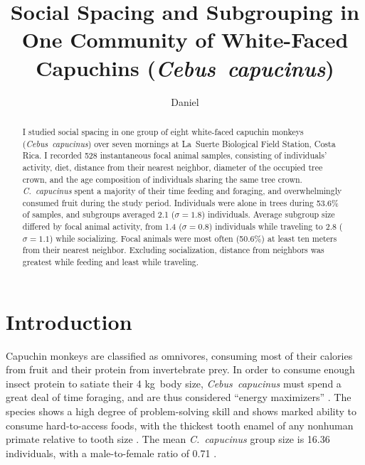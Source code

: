 \documentclass{../../../coursework}
\title{Social Spacing and Subgrouping in One Community of White-Faced Capuchins (\emph{Cebus~capucinus})}
\subtitle{}
\author{Daniel}{Glenn}{Leonard}
\date{\displaydate{date}}
\begin{document}
\maketitle

\begin{abstract}
    I studied social spacing in one group of eight white-faced capuchin
    monkeys (\emph{Cebus~capucinus}) over seven mornings at La~Suerte
    Biological Field Station, Costa Rica. I recorded 528 instantaneous focal
    animal samples, consisting of individuals' activity, diet, distance from
    their nearest neighbor, diameter of the occupied tree crown, and the age
    composition of individuals sharing the same tree crown.
    \emph{C.~capucinus} spent a majority of their time feeding and foraging,
    and overwhelmingly consumed fruit during the study period. Individuals
    were alone in trees during 53.6\% of samples, and subgroups averaged 2.1
    (\(\sigma = 1.8\)) individuals. Average subgroup size differed by focal
    animal activity, from 1.4 (\(\sigma = 0.8\)) individuals while traveling
    to 2.8 (\(\sigma = 1.1\)) while socializing. Focal animals were most often
    (50.6\%) at least ten meters from their nearest neighbor. Excluding
    socialization, distance from neighbors was greatest while feeding and
    least while traveling.
\end{abstract}

\printkeywords

\section{Introduction}

Capuchin monkeys are classified as omnivores, consuming most of their calories
from fruit and their protein from invertebrate prey. In order to consume
enough insect protein to satiate their 4 kg~body size, \emph{Cebus~capucinus}
must spend a great deal of time foraging, and are thus considered ``energy
maximizers'' \parencite{Fragaszy2004}. The species shows a high degree of
problem-solving skill and shows marked ability to consume hard-to-access
foods, with the thickest tooth enamel of any nonhuman primate relative to
tooth size \parencite{Jack2011}. The mean \emph{C.~capucinus} group size is
16.36 individuals, with a male-to-female ratio of 0.71
\parencite{Fragaszy2004}.
\end{document}

